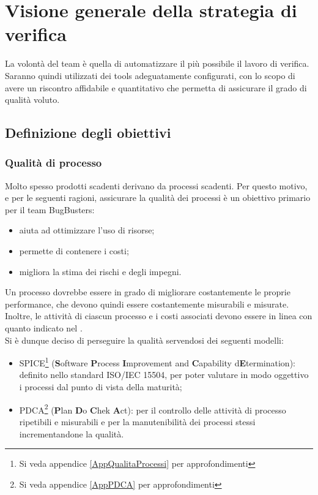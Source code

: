 \newpage
\section{Visione generale della strategia di verifica}
La volontà del team è quella di automatizzare il più possibile il lavoro di verifica. Saranno quindi utilizzati dei tools adeguatamente configurati, con lo scopo di avere un riscontro affidabile e quantitativo che permetta di assicurare il grado di qualità voluto. 

\subsection{Definizione degli obiettivi}
\subsubsection{Qualità di processo}
Molto spesso prodotti scadenti derivano da processi scadenti. Per questo motivo, e per le seguenti ragioni, assicurare la qualità dei processi è un obiettivo primario per il team BugBusters:
\begin{itemize}
	\item aiuta ad ottimizzare l'uso di risorse;
	\item permette di contenere i costi;
	\item migliora la stima dei rischi e degli impegni.
\end{itemize}
Un processo dovrebbe essere in grado di migliorare costantemente le proprie performance, che devono quindi essere costantemente misurabili e misurate. Inoltre, le attività di ciascun processo e i costi associati devono essere in linea con quanto indicato nel \PianoDiProgetto. \\
Si è dunque deciso di perseguire la qualità servendosi dei seguenti modelli: 
\begin{itemize}
	\item SPICE\footnote{Si veda appendice \ref{AppQualitaProcessi} per approfondimenti} (\textbf{S}oftware \textbf{P}rocess \textbf{I}mprovement and \textbf{C}apability d\textbf{E}termination): definito nello standard ISO/IEC 15504, per poter valutare in modo oggettivo i processi dal punto di vista della maturità;
	\item PDCA\footnote{Si veda appendice \ref{AppPDCA} per approfondimenti} (\textbf{P}lan \textbf{D}o \textbf{C}hek \textbf{A}ct): per il controllo delle attività di processo ripetibili e misurabili e per la manutenibilità dei processi stessi incrementandone la qualità.
\end{itemize}

